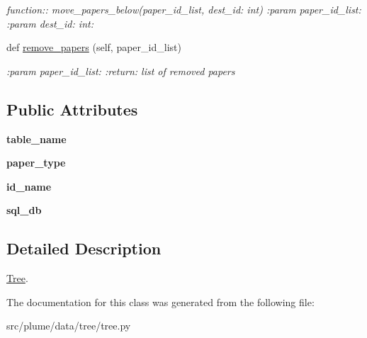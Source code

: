 \begin{DoxyCompactItemize}
\begin{DoxyCompactList}\small\item\em function\+:\+: move\+\_\+papers\+\_\+below(paper\+\_\+id\+\_\+list, dest\+\_\+id\+: int) \+:param paper\+\_\+id\+\_\+list\+: \+:param dest\+\_\+id\+: int\+: \end{DoxyCompactList}\item 
def \hyperlink{classplume-creator_1_1src_1_1plume_1_1data_1_1tree_1_1tree_1_1_tree_add3a5ea6e8f168515a382779348b9a21}{remove\+\_\+papers} (self, paper\+\_\+id\+\_\+list)\hypertarget{classplume-creator_1_1src_1_1plume_1_1data_1_1tree_1_1tree_1_1_tree_add3a5ea6e8f168515a382779348b9a21}{}\label{classplume-creator_1_1src_1_1plume_1_1data_1_1tree_1_1tree_1_1_tree_add3a5ea6e8f168515a382779348b9a21}

\begin{DoxyCompactList}\small\item\em \+:param paper\+\_\+id\+\_\+list\+: \+:return\+: list of removed papers \end{DoxyCompactList}\end{DoxyCompactItemize}
\subsection*{Public Attributes}
\begin{DoxyCompactItemize}
\item 
{\bfseries table\+\_\+name}\hypertarget{classplume-creator_1_1src_1_1plume_1_1data_1_1tree_1_1tree_1_1_tree_aa9a21622259597a65f16a2626e76afcc}{}\label{classplume-creator_1_1src_1_1plume_1_1data_1_1tree_1_1tree_1_1_tree_aa9a21622259597a65f16a2626e76afcc}

\item 
{\bfseries paper\+\_\+type}\hypertarget{classplume-creator_1_1src_1_1plume_1_1data_1_1tree_1_1tree_1_1_tree_a4eb156e0a208195208ebe3c02be8dfb6}{}\label{classplume-creator_1_1src_1_1plume_1_1data_1_1tree_1_1tree_1_1_tree_a4eb156e0a208195208ebe3c02be8dfb6}

\item 
{\bfseries id\+\_\+name}\hypertarget{classplume-creator_1_1src_1_1plume_1_1data_1_1tree_1_1tree_1_1_tree_a6d8c0b859b498c14d6c023f9e40fae11}{}\label{classplume-creator_1_1src_1_1plume_1_1data_1_1tree_1_1tree_1_1_tree_a6d8c0b859b498c14d6c023f9e40fae11}

\item 
{\bfseries sql\+\_\+db}\hypertarget{classplume-creator_1_1src_1_1plume_1_1data_1_1tree_1_1tree_1_1_tree_aa05a7240a5cde23d650e007d20ef95a5}{}\label{classplume-creator_1_1src_1_1plume_1_1data_1_1tree_1_1tree_1_1_tree_aa05a7240a5cde23d650e007d20ef95a5}

\end{DoxyCompactItemize}


\subsection{Detailed Description}
\hyperlink{classplume-creator_1_1src_1_1plume_1_1data_1_1tree_1_1tree_1_1_tree}{Tree}. 

The documentation for this class was generated from the following file\+:\begin{DoxyCompactItemize}
\item 
src/plume/data/tree/tree.\+py\end{DoxyCompactItemize}
